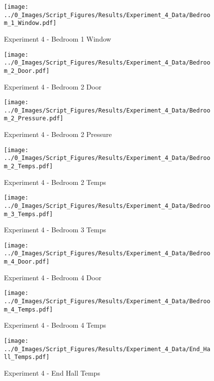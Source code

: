 	\clearpage

	\begin{figure}[H]
		\centering
		\texttt{[image: ../0\_Images/Script\_Figures/Results/Experiment\_4\_Data/Bedroom\_1\_Window.pdf]}
		\caption[]{Experiment 4 - Bedroom 1 Window}
	\end{figure}
 

	\begin{figure}[H]
		\centering
		\texttt{[image: ../0\_Images/Script\_Figures/Results/Experiment\_4\_Data/Bedroom\_2\_Door.pdf]}
		\caption[]{Experiment 4 - Bedroom 2 Door}
	\end{figure}
 
	\clearpage

	\begin{figure}[H]
		\centering
		\texttt{[image: ../0\_Images/Script\_Figures/Results/Experiment\_4\_Data/Bedroom\_2\_Pressure.pdf]}
		\caption[]{Experiment 4 - Bedroom 2 Pressure}
	\end{figure}
 

	\begin{figure}[H]
		\centering
		\texttt{[image: ../0\_Images/Script\_Figures/Results/Experiment\_4\_Data/Bedroom\_2\_Temps.pdf]}
		\caption[]{Experiment 4 - Bedroom 2 Temps}
	\end{figure}
 
	\clearpage

	\begin{figure}[H]
		\centering
		\texttt{[image: ../0\_Images/Script\_Figures/Results/Experiment\_4\_Data/Bedroom\_3\_Temps.pdf]}
		\caption[]{Experiment 4 - Bedroom 3 Temps}
	\end{figure}
 

	\begin{figure}[H]
		\centering
		\texttt{[image: ../0\_Images/Script\_Figures/Results/Experiment\_4\_Data/Bedroom\_4\_Door.pdf]}
		\caption[]{Experiment 4 - Bedroom 4 Door}
	\end{figure}
 
	\clearpage

	\begin{figure}[H]
		\centering
		\texttt{[image: ../0\_Images/Script\_Figures/Results/Experiment\_4\_Data/Bedroom\_4\_Temps.pdf]}
		\caption[]{Experiment 4 - Bedroom 4 Temps}
	\end{figure}
 

	\begin{figure}[H]
		\centering
		\texttt{[image: ../0\_Images/Script\_Figures/Results/Experiment\_4\_Data/End\_Hall\_Temps.pdf]}
		\caption[]{Experiment 4 - End Hall Temps}
	\end{figure}
 
